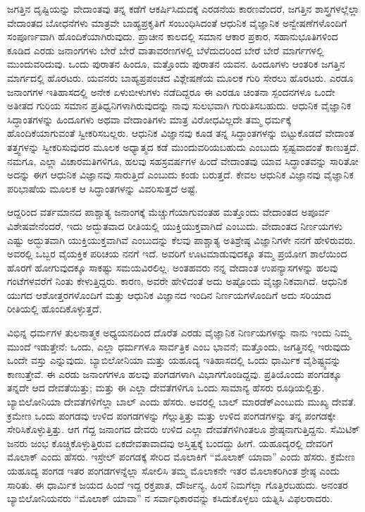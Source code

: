 ಜಗತ್ತಿನ ದೃಷ್ಟಿಯನ್ನು ವೇದಾಂತವು ತನ್ನ ಕಡೆಗೆ ಆಕರ್ಷಿಸಿದುದಕ್ಕೆ ಎರಡನೆಯ ಕಾರಣವೆಂದರೆ, ಜಗತ್ತಿನ ಶಾಸ್ತ್ರಗಳಲ್ಲೆಲ್ಲಾ ವೇದಾಂತದ ಬೋಧನೆಗಳು ಮಾತ್ರವೇ ಬಾಹ್ಯಪ್ರಕೃತಿಗೆ ಸಂಬಂಧಿಸಿದಂತೆ ಆಧುನಿಕ ವೈಜ್ಞಾನಿಕ ಅನ್ವೇಷಣೆಗಳೊಂದಿಗೆ ಸಂಪೂರ್ಣವಾಗಿ ಹೊಂದಿಕೆಯಾಗಿರುವುದು. ಪ್ರಾಚೀನ ಕಾಲದಲ್ಲಿ ಸಮಾನ ಆಕಾರ ಪ್ರಕಾರ, ಸಹಾನುಭೂತಿಗಳಿಂದ ಕೂಡಿದ ಎರಡು ಜನಾಂಗಗಳು ಬೇರೆ ಬೇರೆ ವಾತಾವರಣಗಳಲ್ಲಿ ಬೆಳೆದುದರಿಂದ ಬೇರೆ ಬೇರೆ ಮಾರ್ಗಗಳಲ್ಲಿ ಮುಂದುವರಿದುವು. ಒಂದು ಪುರಾತನ ಹಿಂದೂ, ಮತ್ತೊಂದು ಪುರಾತನ ಯವನ. ಹಿಂದೂಗಳು ಆಂತರಿಕ ಜಗತ್ತಿನ ಮಾರ್ಗದಲ್ಲಿ ಹೊರಟರು. ಯವನರು ಬಾಹ್ಯಪ್ರಪಂಚದ ವಿಶ್ಲೇಷಣೆಯ ಮೂಲಕ ಗುರಿ ಸೇರಲು ಹೊರಟರು. ಎರಡೂ ಜನಾಂಗಗಳ ಇತಿಹಾಸದಲ್ಲಿ ಅನೇಕ ಏಳುಬೀಳುಗಳು ನಡೆದಿದ್ದರೂ ಈ ಎರಡೂ ಚಿಂತನಾ ಸ್ಪಂದನಗಳೂ ಒಂದೇ ಅತೀತದ ಗುರಿಯ ಸಮಾನ ಪ್ರತಿಧ್ವನಿಗಳಾಗಿರುವುದನ್ನು ನಾವು ಸುಲಭವಾಗಿ ಗುರುತಿಸಬಹುದು. ಆಧುನಿಕ ವೈಜ್ಞಾನಿಕ ಸಿದ್ಧಾಂತಗಳನ್ನು ಹಿಂದೂಗಳು ಅಥವಾ ವೇದಾಂತಿಗಳು ಮಾತ್ರ ವಿರೋಧವಿಲ್ಲದೇ ತಮ್ಮ ಧರ್ಮಕ್ಕೆ ಹೊಂದಿಕೆಯಾಗುವಂತೆ ಸ್ವೀಕರಿಸಬಲ್ಲರು. ಆಧುನಿಕ ವಿಜ್ಞಾನವು ಕೂಡ ತನ್ನ ಸಿದ್ಧಾಂತಗಳನ್ನು ಬಿಟ್ಟುಕೊಡದೆ ವೇದಾಂತ ತತ್ತ್ವಗಳನ್ನು ಸ್ವೀಕರಿಸುವುದರ ಮೂಲಕ ಅಧ್ಯಾತ್ಮದ ಕಡೆ ಮುಂದುವರಿಯಬಹುದು ಎಂಬುದು ಸ್ಪಷ್ಟವಾದಂತೆ ಕಾಣುತ್ತದೆ. ನಮಗೂ, ಎಲ್ಲಾ ವಿಚಾರಮತಿಗಳಿಗೂ, ಹಲವು ಸಹಸ್ರವರ್ಷಗಳ ಹಿಂದೆ ವೇದಾಂತವು ಯಾವ ಸಿದ್ಧಾಂತವನ್ನು ಸಾರಿತೋ ಅದನ್ನು ಈಗ ಆಧುನಿಕ ವಿಜ್ಞಾನವು ಸಾರುತ್ತಿದೆ ಎಂಬುದು ಕಂಡು ಬರುತ್ತದೆ. ಕೇವಲ ಆಧುನಿಕ ವಿಜ್ಞಾನವು ವೈಜ್ಞಾನಿಕ ಪರಿಭಾಷೆಯ ಮೂಲಕ ಆ ಸಿದ್ಧಾಂತಗಳನ್ನು ವಿವರಿಸುತ್ತದೆ ಅಷ್ಟೆ.

ಆದ್ದರಿಂದ ವರ್ತಮಾನದ ಪಾಶ್ಚಾತ್ಯ ಜನಾಂಗಕ್ಕೆ ಮೆಚ್ಚುಗೆಯಾಗುವಂತಹ ಮತ್ತೊಂದು ವೇದಾಂತದ ಅಪೂರ್ವ ವಿಶೇಷವೇನೆಂದರೆ, ಇದು ಅದ್ಭುತವಾದ ರೀತಿಯಲ್ಲಿ ಯುಕ್ತಿಯುಕ್ತವಾಗಿದೆ ಎಂಬುದು. ವೇದಾಂತದ ನಿರ್ಣಯಗಳು ಎಷ್ಟು ಅದ್ಭುತವಾಗಿ ಯುಕ್ತಿಯುಕ್ತವಾಗಿವೆ ಎಂಬುದನ್ನು ಕೆಲವು ಪಾಶ್ಚಾತ್ಯ ಅತಿಶ್ರೇಷ್ಠ ವಿಜ್ಞಾನಿಗಳೇ ನನಗೆ ಹೇಳಿರುವರು. ಅವರಲ್ಲಿ ಒಬ್ಬರ ವೈಯಕ್ತಿಕ ಪರಿಚಯ ನನಗೆ ಇದೆ. ಅವರಿಗೆ ಊಟಮಾಡುವುದಕ್ಕೂ ತಮ್ಮ ಪ್ರಯೋಗ ಶಾಲೆಯಿಂದ ಹೊರಗೆ ಹೋಗುವುದಕ್ಕೂ ಸಾಕಷ್ಟು ಸಮಯವಿರಲಿಲ್ಲ. ಅಂತಹವರು ನನ್ನ ವೇದಾಂತ ಉಪನ್ಯಾಸಗಳನ್ನು ಹಲವು ಗಂಟೆಗಳವರೆಗೆ ನಿಂತು ಕೇಳುತ್ತಿದ್ದರು. ಕಾರಣ, ಅವರೇ ಹೇಳಿದಂತೆ ಅದು ಅಷ್ಟೊಂದು ವೈಜ್ಞಾನಿಕವಾಗಿದೆ. ಆಧುನಿಕ ಯುಗದ ಆಶೋತ್ತರಗಳೊಂದಿಗೆ ಮತ್ತು ಆಧುನಿಕ ವಿಜ್ಞಾನದ ಇಂದಿನ ನಿರ್ಣಯಗಳೊಂದಿಗೆ ಅದು ಸರಿಯಾದ ರೀತಿಯಲ್ಲಿ ಹೊಂದಿಕೊಳ್ಳುತ್ತದೆ.

ವಿಭಿನ್ನ ಧರ್ಮಗಳ ತುಲನಾತ್ಮಕ ಅಧ್ಯಯನದಿಂದ ದೊರೆತ ಎರಡು ವೈಜ್ಞಾನಿಕ ನಿರ್ಣಯಗಳನ್ನು ನಾನು ಇಂದು ನಿಮ್ಮ ಮುಂದೆ ಇಡುತ್ತೇನೆ: ಒಂದು, ಎಲ್ಲಾ ಧರ್ಮಗಳೂ ಸಾರ್ವತ್ರಿಕ ಎಂಬ ಭಾವನೆ; ಮತ್ತೊಂದು, ಜಗತ್ತಿನಲ್ಲಿ ಇರುವುದು ಒಂದೇ ವಸ್ತು ಎನ್ನುವುದು. ಬ್ಯಾಬಿಲೋನಿಯಾ ಮತ್ತು ಯಹೂದ್ಯ ಇತಿಹಾಸದಲ್ಲಿ ಒಂದು ಧಾರ್ಮಿಕ ವೈಶಿಷ್ಟ್ಯವನ್ನು ಕಾಣುತ್ತೇವೆ. ಈ ಎರಡು ಜನಾಂಗಗಳೂ ಹಲವು ಪಂಗಡಗಳಾಗಿ ವಿಭಾಗಗೊಂಡಿದ್ದವು. ಪ್ರತಿಯೊಂದು ಪಂಗಡಕ್ಕೂ ತನ್ನದೇ ಆದ ದೇವತೆಯಿತ್ತು; ಮತ್ತು ಈ ಎಲ್ಲಾ ದೇವತೆಗಳಿಗೂ ಒಂದು ಸಾಮಾನ್ಯ ಹೆಸರು ರೂಢಿಯಲ್ಲಿತ್ತು. ಬ್ಯಾಬಿಲೋನಿಯಾ ದೇವತೆಗಳಿಗೆಲ್ಲಾ ಬಾಲ್​ ಎಂದು ಹೆಸರು. ಅವರಲ್ಲಿ ಬಾಲ್​ ಮಾರಡೆಕ್​ ಎಂಬುದು ಮುಖ್ಯ ದೇವತೆ. ಕ್ರಮೇಣ ಒಂದು ಪಂಗಡವು ಉಳಿದ ಪಂಗಡಗಳನ್ನು ಗೆಲ್ಲುತ್ತಿತ್ತು ಮತ್ತು ಉಳಿದ ಪಂಗಡಗಳನ್ನು ತನ್ನ ಪಂಗಡಕ್ಕೇ ಸೇರಿಸಿಕೊಳ್ಳುತ್ತಿತ್ತು. ಆಗ ಗೆದ್ದ ಜನಾಂಗದ ದೇವರು ಉಳಿದ ಎಲ್ಲಾ ದೇವತೆಗಳಿಗಿಂತಲೂ ಶ್ರೇಷ್ಠನಾಗುತ್ತಿದ್ದನು. ಸೆಮಿಟಿಕ್​ ಜನರು ಜಂಭ ಕೊಚ್ಚಿಕೊಳ್ಳುತ್ತಿರುವ ಏಕದೇವತಾವಾದವು ಅಸ್ತಿತ್ವಕ್ಕೆ ಬಂದದ್ದು ಹೀಗೆ. ಯಹೂದ್ಯರಲ್ಲಿ ದೇವರಿಗೆ ಮೊಲಾಕ್​ ಎಂದು ಹೆಸರು. ಇಸ್ರೇಲ್​ ಪಂಗಡಕ್ಕೆ ಸೇರಿದ ಮೊಲಾಕಿಗೆ “ಮೊಲಾಕ್​ ಯಾವಾ” ಎಂದು ಹೆಸರು. ಕ್ರಮೇಣ ಯಹೂದ್ಯ ಪಂಗಡ ಇತರ ಪಂಗಡಗಳನ್ನೆಲ್ಲಾ ಸೋಲಿಸಿ ತಮ್ಮ ಮೊಲಾಕನೇ ಇತರ ಮೊಲಾಕರಿಗಿಂತ ಶ್ರೇಷ್ಠ ಎಂದು ಸಾರಿತು. ಈ ಧಾರ್ಮಿಕ ಜಯದ ಹಿಂದೆ ಇದ್ದ ರಕ್ತಪಾತ, ದೌರ್ಜನ್ಯ, ಹಿಂಸೆ ನಿಮಗೆಲ್ಲಾ ಗೊತ್ತಿರಬಹುದು. ಅನಂತರ ಬ್ಯಾಬಿಲೋನಿಯನರು “ಮೊಲಾಕ್​ ಯಾವಾ” ನ ಸರ್ವಾಧಿಕಾರವನ್ನು ಕಸಿದುಕೊಳ್ಳಲು ಯತ್ನಿಸಿ ವಿಫಲರಾದರು.

